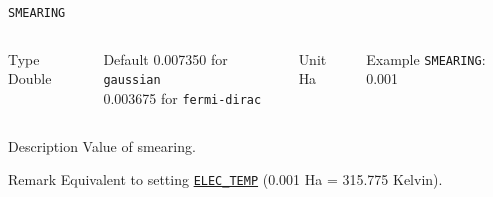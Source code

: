 \begin{frame}[allowframebreaks]{\texttt{SMEARING}} \label{SMEARING}
\vspace*{-12pt}
\begin{columns}
\begin{block}{Type}
Double
\end{block}

\begin{block}{Default}
0.007350 for \texttt{gaussian} \\
0.003675 for \texttt{fermi-dirac}
\end{block}

\begin{block}{Unit}
Ha
\end{block}

\begin{block}{Example}
\texttt{SMEARING}: 0.001
\end{block}
\end{columns}

\begin{block}{Description}
Value of smearing.
\end{block}

\begin{block}{Remark}
Equivalent to setting \hyperlink{ELEC_TEMP}{\texttt{ELEC\_TEMP}} (0.001 Ha = 315.775 Kelvin).
\end{block}

\end{frame}




